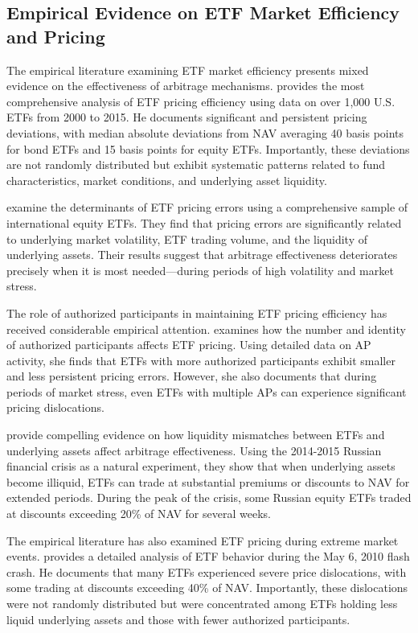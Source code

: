 \subsection{Empirical Evidence on ETF Market Efficiency and Pricing}

The empirical literature examining ETF market efficiency presents mixed evidence on the effectiveness of arbitrage mechanisms. \citet{petajisto2017inefficiencies} provides the most comprehensive analysis of ETF pricing efficiency using data on over 1,000 U.S. ETFs from 2000 to 2015. He documents significant and persistent pricing deviations, with median absolute deviations from NAV averaging 40 basis points for bond ETFs and 15 basis points for equity ETFs. Importantly, these deviations are not randomly distributed but exhibit systematic patterns related to fund characteristics, market conditions, and underlying asset liquidity.

\citet{shin2013basis} examine the determinants of ETF pricing errors using a comprehensive sample of international equity ETFs. They find that pricing errors are significantly related to underlying market volatility, ETF trading volume, and the liquidity of underlying assets. Their results suggest that arbitrage effectiveness deteriorates precisely when it is most needed—during periods of high volatility and market stress.

The role of authorized participants in maintaining ETF pricing efficiency has received considerable empirical attention. \citet{dannhauser2017effect} examines how the number and identity of authorized participants affects ETF pricing. Using detailed data on AP activity, she finds that ETFs with more authorized participants exhibit smaller and less persistent pricing errors. However, she also documents that during periods of market stress, even ETFs with multiple APs can experience significant pricing dislocations.

\citet{pan2016etf} provide compelling evidence on how liquidity mismatches between ETFs and underlying assets affect arbitrage effectiveness. Using the 2014-2015 Russian financial crisis as a natural experiment, they show that when underlying assets become illiquid, ETFs can trade at substantial premiums or discounts to NAV for extended periods. During the peak of the crisis, some Russian equity ETFs traded at discounts exceeding 20\% of NAV for several weeks.

The empirical literature has also examined ETF pricing during extreme market events. \citet{madhavan2012exchange} provides a detailed analysis of ETF behavior during the May 6, 2010 flash crash. He documents that many ETFs experienced severe price dislocations, with some trading at discounts exceeding 40\% of NAV. Importantly, these dislocations were not randomly distributed but were concentrated among ETFs holding less liquid underlying assets and those with fewer authorized participants.

